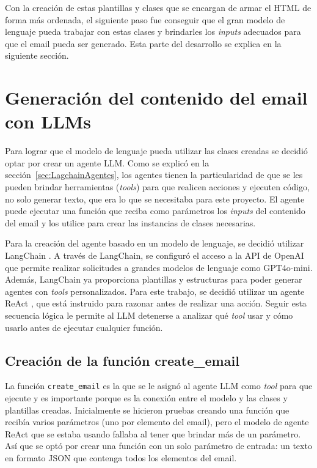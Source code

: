 Con la creación de estas plantillas y clases que se encargan de armar el HTML de forma más ordenada, el siguiente paso fue conseguir que el gran modelo de lenguaje pueda trabajar con estas clases y brindarles los \textit{inputs} adecuados para que el email pueda ser generado. Esta parte del desarrollo se explica en la siguiente sección.


\section{Generación del contenido del email con LLMs}

Para lograr que el modelo de lenguaje pueda utilizar las clases creadas se decidió optar por crear un agente LLM. Como se explicó en la sección~\ref{sec:LagchainAgentes}, los agentes tienen la particularidad de que se les pueden brindar herramientas (\textit{tools}) para que realicen acciones y ejecuten código, no solo generar texto, que era lo que se necesitaba para este proyecto. El agente puede ejecutar una función que reciba como parámetros los \textit{inputs} del contenido del email y los utilice para crear las instancias de clases necesarias.

Para la creación del agente basado en un modelo de lenguaje, se decidió utilizar LangChain \cite{langchain}. A través de LangChain, se configuró el acceso a la API de OpenAI que permite realizar solicitudes a grandes modelos de lenguaje como GPT4o-mini. Además, LangChain ya proporciona plantillas y estructuras para poder generar agentes con \textit{tools} personalizados. Para este trabajo, se decidió utilizar un agente ReAct \cite{yao2022react}, que está instruido para razonar antes de realizar una acción. Seguir esta secuencia lógica le permite al LLM detenerse a analizar qué \textit{tool} usar y cómo usarlo antes de ejecutar cualquier función.

\subsection{Creación de la función create\_email}

La función \texttt{create\_email} es la que se le asignó al agente LLM como \textit{tool} para que ejecute y es importante porque es la conexión entre el modelo y las clases y plantillas creadas. Inicialmente se hicieron pruebas creando una función que recibía varios parámetros (uno por elemento del email), pero el modelo de agente ReAct que se estaba usando fallaba al tener que brindar más de un parámetro. Así que se optó por crear una función con un solo parámetro de entrada: un texto en formato JSON que contenga todos los elementos del email.

